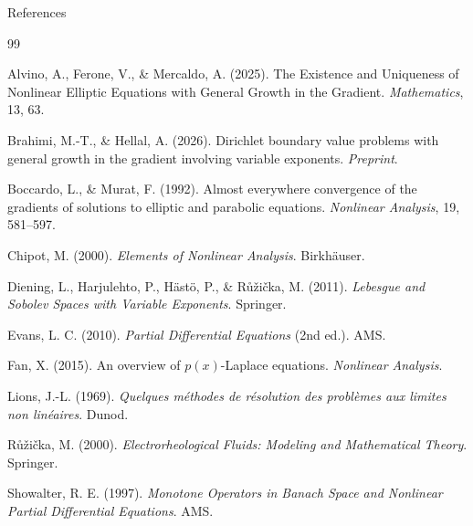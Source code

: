 \documentclass[11pt]{beamer}
\begin{document}
	\begin{frame}[allowframebreaks]{References}
		\begin{thebibliography}{99}
			\small
			\setlength{\itemsep}{4pt}
			
			Alvino, A., Ferone, V., \& Mercaldo, A. (2025).
			The Existence and Uniqueness of Nonlinear Elliptic Equations with General Growth in the Gradient.
			\textit{Mathematics}, 13, 63.
			
			Brahimi, M.-T., \& Hellal, A. (2026).
			Dirichlet boundary value problems with general growth in the gradient involving variable exponents.
			\textit{Preprint}.
			
			Boccardo, L., \& Murat, F. (1992).
			Almost everywhere convergence of the gradients of solutions to elliptic and parabolic equations.
			\textit{Nonlinear Analysis}, 19, 581–597.
			
			Chipot, M. (2000).
			\textit{Elements of Nonlinear Analysis}.
			Birkhäuser.
			
			Diening, L., Harjulehto, P., Hästö, P., \& Růžička, M. (2011).
			\textit{Lebesgue and Sobolev Spaces with Variable Exponents}.
			Springer.
			
			Evans, L. C. (2010).
			\textit{Partial Differential Equations} (2nd ed.).
			AMS.
			
			Fan, X. (2015).
			An overview of $p(x)$-Laplace equations.
			\textit{Nonlinear Analysis}.
			
			Lions, J.-L. (1969).
			\textit{Quelques méthodes de résolution des problèmes aux limites non linéaires}.
			Dunod.
			
			Růžička, M. (2000).
			\textit{Electrorheological Fluids: Modeling and Mathematical Theory}.
			Springer.
			
			Showalter, R. E. (1997).
			\textit{Monotone Operators in Banach Space and Nonlinear Partial Differential Equations}.
			AMS.
		\end{thebibliography}
	\end{frame}
	
\end{document}
